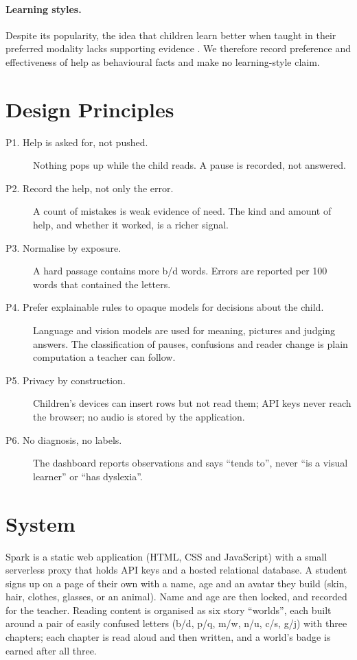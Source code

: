 \documentclass[manuscript, screen, review, anonymous]{acmart}
\begin{document}
\paragraph{Learning styles.} Despite its popularity, the idea that children learn better when taught in their preferred modality lacks supporting evidence \cite{pashler2008}. We therefore record preference and effectiveness of help as behavioural facts and make no learning-style claim.

\section{Design Principles}
\begin{description}
\item[P1. Help is asked for, not pushed.] Nothing pops up while the child reads. A pause is recorded, not answered.
\item[P2. Record the help, not only the error.] A count of mistakes is weak evidence of need. The kind and amount of help, and whether it worked, is a richer signal.
\item[P3. Normalise by exposure.] A hard passage contains more b/d words. Errors are reported per 100 words that contained the letters.
\item[P4. Prefer explainable rules to opaque models for decisions about the child.] Language and vision models are used for meaning, pictures and judging answers. The classification of pauses, confusions and reader change is plain computation a teacher can follow.
\item[P5. Privacy by construction.] Children's devices can insert rows but not read them; API keys never reach the browser; no audio is stored by the application.
\item[P6. No diagnosis, no labels.] The dashboard reports observations and says ``tends to'', never ``is a visual learner'' or ``has dyslexia''.
\end{description}

\section{System}
Spark is a static web application (HTML, CSS and JavaScript) with a small serverless proxy that holds API keys and a hosted relational database. A student signs up on a page of their own with a name, age and an avatar they build (skin, hair, clothes, glasses, or an animal). Name and age are then locked, and recorded for the teacher. Reading content is organised as six story ``worlds'', each built around a pair of easily confused letters (b/d, p/q, m/w, n/u, c/s, g/j) with three chapters; each chapter is read aloud and then written, and a world's badge is earned after all three.
\end{document}
